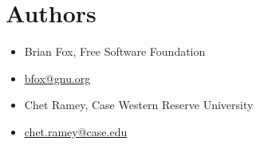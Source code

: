 \section{Authors}\label{authors}
    \begin{itemize}[leftmargin=0pt]
        \item[]  Brian Fox, Free Software Foundation 
        \item[]  \quad\url{bfox@gnu.org}
        \item[]  Chet Ramey, Case Western Reserve University 
        \item[]  \quad\url{chet.ramey@case.edu}
    \end{itemize}